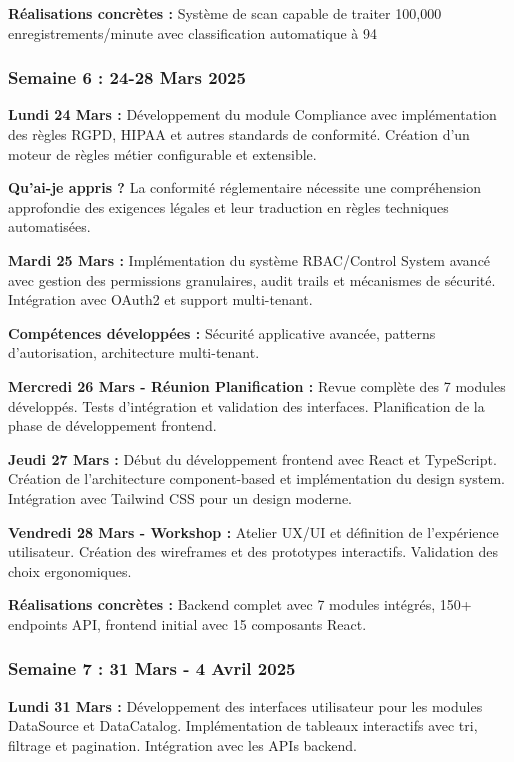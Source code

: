 \documentclass[a4paper,12pt]{article}
\begin{document}
\textbf{Réalisations concrètes :} Système de scan capable de traiter 100,000 enregistrements/minute avec classification automatique à 94%

\subsubsection{Semaine 6 : 24-28 Mars 2025}

\textbf{Lundi 24 Mars :}
Développement du module Compliance avec implémentation des règles RGPD, HIPAA et autres standards de conformité. Création d'un moteur de règles métier configurable et extensible.

\textbf{Qu'ai-je appris ?} La conformité réglementaire nécessite une compréhension approfondie des exigences légales et leur traduction en règles techniques automatisées.

\textbf{Mardi 25 Mars :}
Implémentation du système RBAC/Control System avancé avec gestion des permissions granulaires, audit trails et mécanismes de sécurité. Intégration avec OAuth2 et support multi-tenant.

\textbf{Compétences développées :} Sécurité applicative avancée, patterns d'autorisation, architecture multi-tenant.

\textbf{Mercredi 26 Mars - Réunion Planification :}
Revue complète des 7 modules développés. Tests d'intégration et validation des interfaces. Planification de la phase de développement frontend.

\textbf{Jeudi 27 Mars :}
Début du développement frontend avec React et TypeScript. Création de l'architecture component-based et implémentation du design system. Intégration avec Tailwind CSS pour un design moderne.

\textbf{Vendredi 28 Mars - Workshop :}
Atelier UX/UI et définition de l'expérience utilisateur. Création des wireframes et des prototypes interactifs. Validation des choix ergonomiques.

\textbf{Réalisations concrètes :} Backend complet avec 7 modules intégrés, 150+ endpoints API, frontend initial avec 15 composants React.

\subsubsection{Semaine 7 : 31 Mars - 4 Avril 2025}

\textbf{Lundi 31 Mars :}
Développement des interfaces utilisateur pour les modules DataSource et DataCatalog. Implémentation de tableaux interactifs avec tri, filtrage et pagination. Intégration avec les APIs backend.
\end{document}
